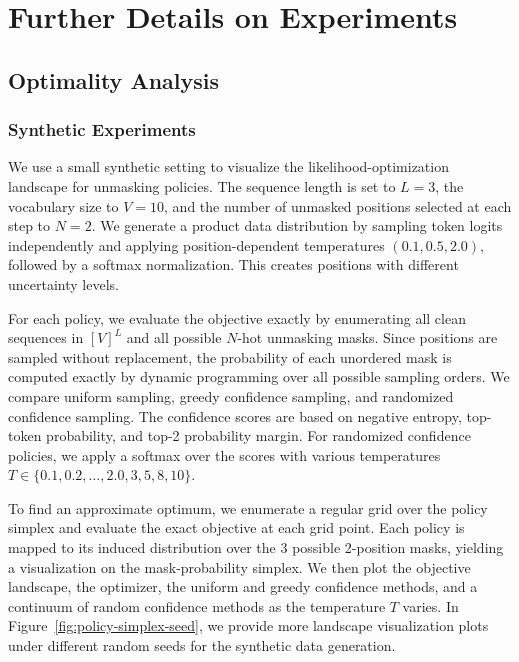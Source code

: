 \section{Further Details on Experiments}\label{sec:experiment-appendix}
\subsection{Optimality Analysis}
\subsubsection{Synthetic Experiments}\label{subsec:synthetic}

We use a small synthetic setting to visualize the likelihood-optimization landscape for unmasking policies. The sequence length is set to $L=3$, the vocabulary size to $V=10$, and the number of unmasked positions selected at each step to $N=2$. We generate a product data distribution by sampling token logits independently and applying position-dependent temperatures $(0.1,0.5,2.0)$, followed by a softmax normalization. This creates positions with different uncertainty levels.

For each policy, we evaluate the objective exactly by enumerating all clean sequences in $[V]^L$ and all possible $N$-hot unmasking masks. Since positions are sampled without replacement, the probability of each unordered mask is computed exactly by dynamic programming over all possible sampling orders. We compare uniform sampling, greedy confidence sampling, and randomized confidence sampling. The confidence scores are based on negative entropy, top-token probability, and top-2 probability margin. For randomized confidence policies, we apply a softmax over the scores with various temperatures $T \in \{0.1,0.2,\ldots,2.0,3,5,8,10\}$.

To find an approximate optimum, we enumerate a regular grid over the policy simplex and evaluate the exact objective at each grid point. Each policy is mapped to its induced distribution over the 3 possible 2-position masks, yielding a visualization on the mask-probability simplex. We then plot the objective landscape, the optimizer, the uniform and greedy confidence methods, and a continuum of random confidence methods as the temperature $T$ varies. In Figure~\ref{fig:policy-simplex-seed}, we provide more landscape visualization plots under different random seeds for the synthetic data generation.

